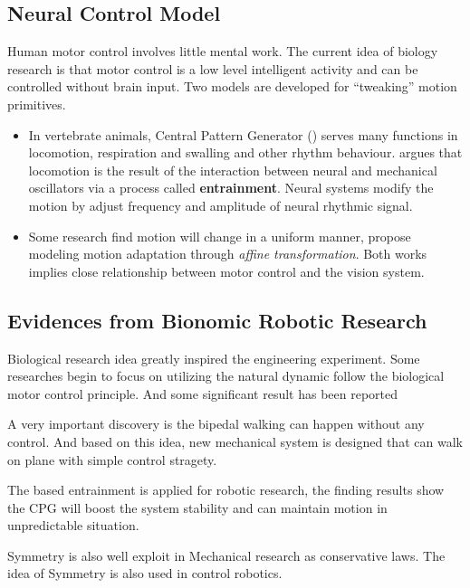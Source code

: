 \subsection{Neural Control Model}
Human motor control involves little mental work.
The current idea of biology research is that motor control is a low level intelligent activity and can be controlled  without brain input. 
Two models are developed for ``tweaking'' motion primitives.
\begin{itemize}
\item
In vertebrate animals,  Central Pattern Generator (\cpg) serves many functions in locomotion, respiration and swalling and other rhythm behaviour.
\citet{Cohen1988a} argues that locomotion is the result of the interaction between neural and mechanical oscillators via a process called \textbf{entrainment}.
Neural systems modify the motion by adjust frequency and amplitude of neural rhythmic signal.



\item
Some research find motion will change in a uniform manner\citep{Viviani1992},\citep{flash2007affine} propose modeling motion adaptation through \emph{affine transformation}.
Both works implies close relationship between motor control and the vision system.
\end{itemize}









\subsection{ Evidences from Bionomic Robotic Research}
Biological research idea greatly inspired the engineering experiment.
Some researches begin to focus on utilizing the natural dynamic follow the biological motor control principle.
And some significant result has been reported
\begin{itemize}
A very important discovery is the bipedal walking can happen without any control\citep{McGeer1990}.  
And based on this idea, new mechanical system is designed that can walk on plane with simple control stragety\citep{Collins2005}.

The \cpg based entrainment is applied for robotic research\citep{Williamson1999a}, the finding results show the CPG will boost the system stability and can maintain motion in unpredictable situation.

Symmetry is also well exploit in Mechanical research as conservative laws.
The idea of Symmetry is also used in control robotics\citep{spong2005controlled}.
\end{itemize}

